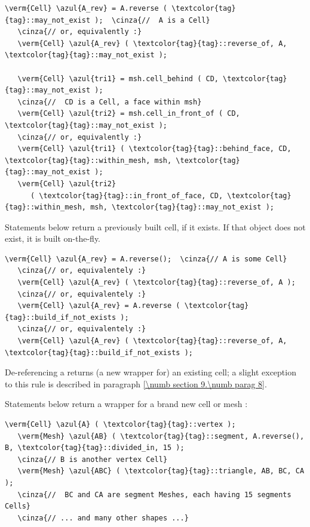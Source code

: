 \begin{Verbatim}[commandchars=\\\{\},formatcom=\small\tt,
   baselinestretch=0.94,framesep=2mm                      ]
   \verm{Cell} \azul{A_rev} = A.reverse ( \textcolor{tag}{tag}::may_not_exist );  \cinza{//  A is a Cell}
   \cinza{// or, equivalently :}
   \verm{Cell} \azul{A_rev} ( \textcolor{tag}{tag}::reverse_of, A, \textcolor{tag}{tag}::may_not_exist );
   
   \verm{Cell} \azul{tri1} = msh.cell_behind ( CD, \textcolor{tag}{tag}::may_not_exist );
   \cinza{//  CD is a Cell, a face within msh}
   \verm{Cell} \azul{tri2} = msh.cell_in_front_of ( CD, \textcolor{tag}{tag}::may_not_exist );
   \cinza{// or, equivalently :}
   \verm{Cell} \azul{tri1} ( \textcolor{tag}{tag}::behind_face, CD, \textcolor{tag}{tag}::within_mesh, msh, \textcolor{tag}{tag}::may_not_exist );
   \verm{Cell} \azul{tri2}
      ( \textcolor{tag}{tag}::in_front_of_face, CD, \textcolor{tag}{tag}::within_mesh, msh, \textcolor{tag}{tag}::may_not_exist );
\end{Verbatim}

Statements below return a previously built cell, if it exists.
If that object does not exist, it is built on-the-fly.

\begin{Verbatim}[commandchars=\\\{\},formatcom=\small\tt,
   baselinestretch=0.94,framesep=2mm                      ]
   \verm{Cell} \azul{A_rev} = A.reverse();  \cinza{// A is some Cell}
   \cinza{// or, equivalentely :}
   \verm{Cell} \azul{A_rev} ( \textcolor{tag}{tag}::reverse_of, A );
   \cinza{// or, equivalentely :}
   \verm{Cell} \azul{A_rev} = A.reverse ( \textcolor{tag}{tag}::build_if_not_exists );
   \cinza{// or, equivalentely :}
   \verm{Cell} \azul{A_rev} ( \textcolor{tag}{tag}::reverse_of, A, \textcolor{tag}{tag}::build_if_not_exists );
\end{Verbatim}

De-referencing a {\small\tt{}} returns (a new wrapper for) an existing cell;
a slight exception to this rule is described in paragraph \ref{\numb section 9.\numb parag 8}.

Statements below return a wrapper for a brand new cell or mesh :

\begin{Verbatim}[commandchars=\\\{\},formatcom=\small\tt,
   baselinestretch=0.94,framesep=2mm                      ]
   \verm{Cell} \azul{A} ( \textcolor{tag}{tag}::vertex );
   \verm{Mesh} \azul{AB} ( \textcolor{tag}{tag}::segment, A.reverse(), B, \textcolor{tag}{tag}::divided_in, 15 );
   \cinza{// B is another vertex Cell}
   \verm{Mesh} \azul{ABC} ( \textcolor{tag}{tag}::triangle, AB, BC, CA );
   \cinza{//  BC and CA are segment Meshes, each having 15 segments Cells}
   \cinza{// ... and many other shapes ...}
\end{Verbatim}




